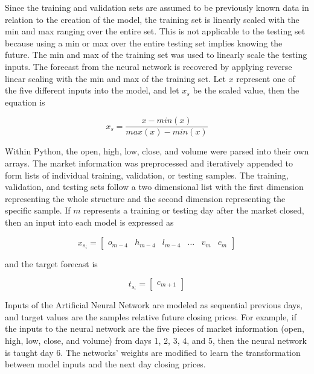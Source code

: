 Since the training and validation sets are assumed to be previously known data in relation to the creation of the model, the training set is linearly scaled with the min and max ranging over the entire set.
This is not applicable to the testing set because using a min or max over the entire testing set implies knowing the future.
The min and max of the training set was used to linearly scale the testing inputs.
The forecast from the neural network is recovered by applying reverse linear scaling with the min and max of the training set.
Let $x$ represent one of the five different inputs into the model, and let $x_s$ be the scaled value, then the equation is

\begin{equation}
	x_s = \dfrac{x-min(x)}{max(x)-min(x)}\label{eq:equation8}
\end{equation}

Within Python, the open, high, low, close, and volume were parsed into their own arrays.
The market information was preprocessed and iteratively appended to form lists of individual training, validation, or testing samples.
The training, validation, and testing sets follow a two dimensional list with the first dimension representing the whole structure and the second dimension representing the specific sample.
If $m$ represents a training or testing day after the market closed, then an input into each model is expressed as

\begin{equation}
	x_{s_i} =
	\begin{bmatrix}
		o_{m-4} & h_{m-4} & l_{m-4} & \dots & v_m & c_m
	\end{bmatrix}\label{eq:equation9}
\end{equation}

and the target forecast is

\begin{equation}
	t_{s_i} =
	\begin{bmatrix}
		c_{m+1}
	\end{bmatrix}\label{eq:equation10}
\end{equation}

Inputs of the Artificial Neural Network are modeled as sequential previous days, and target values are the samples relative future closing prices.
For example, if the inputs to the neural network are the five pieces of market information (open, high, low, close, and volume) from days 1, 2, 3, 4, and 5, then the neural network is taught day 6.
The networks' weights are modified to learn the transformation between model inputs and the next day closing prices.

